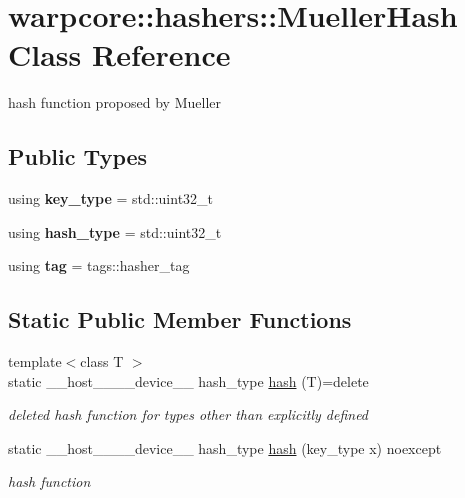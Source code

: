 \hypertarget{classwarpcore_1_1hashers_1_1MuellerHash}{}\section{warpcore\+:\+:hashers\+:\+:Mueller\+Hash Class Reference}
\label{classwarpcore_1_1hashers_1_1MuellerHash}


hash function proposed by Mueller  


\subsection*{Public Types}
\begin{DoxyCompactItemize}
\item 
\mbox{\label{classwarpcore_1_1hashers_1_1MuellerHash_a14b100811e97a47b6ba363ee092f664a}} 
using {\bfseries key\+\_\+type} = std\+::uint32\+\_\+t
\item 
\mbox{\label{classwarpcore_1_1hashers_1_1MuellerHash_a9085ddbded055d883f0f7a45b989a33e}} 
using {\bfseries hash\+\_\+type} = std\+::uint32\+\_\+t
\item 
\mbox{\label{classwarpcore_1_1hashers_1_1MuellerHash_abe3c671d003b820aecc6f3702f64cabc}} 
using {\bfseries tag} = tags\+::hasher\+\_\+tag
\end{DoxyCompactItemize}
\subsection*{Static Public Member Functions}
\begin{DoxyCompactItemize}
\item 
{\footnotesize template$<$class T $>$ }\\static \+\_\+\+\_\+host\+\_\+\+\_\+\+\_\+\+\_\+device\+\_\+\+\_\+ hash\+\_\+type \hyperlink{classwarpcore_1_1hashers_1_1MuellerHash_af2d2d88d32709788964af04198e4f60c}{hash} (T)=delete
\begin{DoxyCompactList}\small\item\em deleted hash function for types other than explicitly defined \end{DoxyCompactList}\item 
static \+\_\+\+\_\+host\+\_\+\+\_\+\+\_\+\+\_\+device\+\_\+\+\_\+ hash\+\_\+type \hyperlink{classwarpcore_1_1hashers_1_1MuellerHash_aa02ad6cfc87f45c9c16fb563811f8919}{hash} (key\+\_\+type x) noexcept
\begin{DoxyCompactList}\small\item\em hash function \end{DoxyCompactList}\end{DoxyCompactItemize}


